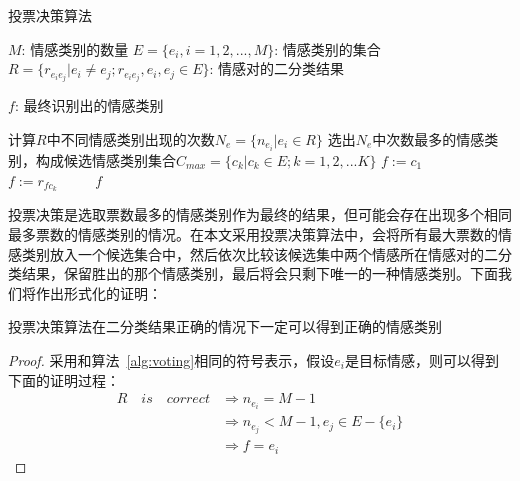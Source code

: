 \begin{algorithm}[htb]
    \caption{投票决策算法}
    \label{alg:voting}
    
    \begin{algorithmic}[1]
        \Require %
            \Statex $M$: 情感类别的数量 
            \Statex $E = \{e_i, i=1,2,...,M\}$: 情感类别的集合
            \Statex $R = \{r_{e_ie_j}|e_i \neq e_j; r_{e_ie_j}, e_i, e_j \in E\}$: 情感对的二分类结果

        \Ensure %
            \Statex $f$: 最终识别出的情感类别

        \Statex
        \State  计算$R$中不同情感类别出现的次数$N_e = \{n_{e_i}|e_i \in R\}$ %
        \State  选出$N_e$中次数最多的情感类别，构成候选情感类别集合$C_{max} = \{c_k|c_k \in E; k = 1,2,...K\}$
        \State  $f := c_1$
                \State $f := r_{fc_k}$
            \EndFor
    　　 \EndIf
        \State \Return $f$
    \end{algorithmic}
\end{algorithm}

投票决策是选取票数最多的情感类别作为最终的结果，但可能会存在出现多个相同最多票数的情感类别的情况。在本文采用投票决策算法中，会将所有最大票数的情感类别放入一个候选集合中，然后依次比较该候选集中两个情感所在情感对的二分类结果，保留胜出的那个情感类别，最后将会只剩下唯一的一种情感类别。下面我们将作出形式化的证明：

\begin{proposition}
    投票决策算法在二分类结果正确的情况下一定可以得到正确的情感类别
\end{proposition}
\begin{proof}
    采用和算法~\ref{alg:voting}相同的符号表示，假设$e_i$是目标情感，则可以得到下面的证明过程：
    \[
        \begin{aligned}
            R \quad is \quad correct &\Rightarrow n_{e_i} = M - 1 \\
            &\Rightarrow n_{e_j} < M - 1, e_j \in E - \{e_i\} \\
            &\Rightarrow f = e_i
        \end{aligned}
    \]
\end{proof}

